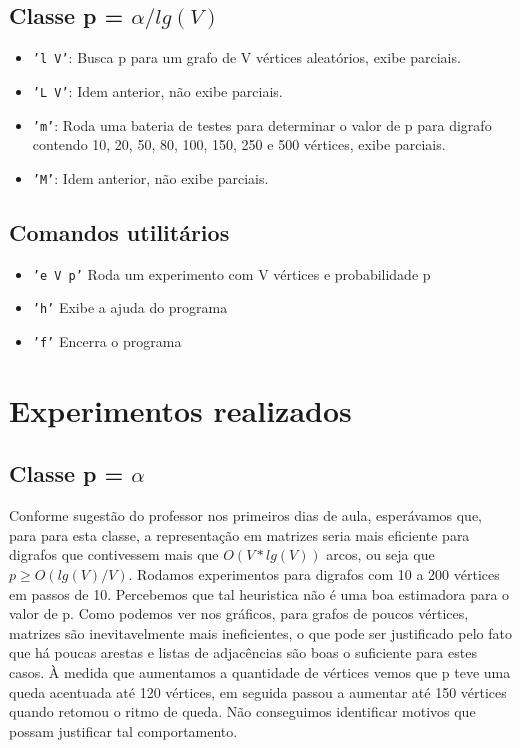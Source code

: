 \documentclass[brazil,times]{abnt}
\begin{document}
\subsection*{Classe p = $\alpha/lg(V)$}
\begin{itemize}
	\item[] \texttt{'l V'}: Busca p para um grafo de V vértices aleatórios, exibe parciais.
	\item[] \texttt{'L V'}: Idem anterior, não exibe parciais.
	\item[] \texttt{'m'}: Roda uma bateria de testes para determinar o valor de p para digrafo contendo 10, 20, 50, 80, 100, 150, 250 e 500 vértices, exibe parciais.
	\item[] \texttt{'M'}: Idem anterior, não exibe parciais.
\end{itemize}

\subsection*{Comandos utilitários}
\begin{itemize}
	\item[] \texttt{'e V p'} Roda um experimento com V vértices e probabilidade p
	\item[] \texttt{'h'} Exibe a ajuda do programa
	\item[] \texttt{'f'} Encerra o programa 
\end{itemize}

\section*{Experimentos realizados}
\subsection*{Classe p = $\alpha$}
Conforme sugestão do professor nos primeiros dias de aula, esperávamos que, para para esta classe, a representação em matrizes seria mais eficiente para digrafos que contivessem mais que $O(V*lg(V))$ arcos, ou seja que $p \ge O(lg(V)/V)$. Rodamos experimentos para digrafos com 10 a 200 vértices em passos de 10. Percebemos que tal heuristica não é uma boa estimadora para o valor de p. Como podemos ver nos gráficos, para grafos de poucos vértices, matrizes são inevitavelmente mais ineficientes, o que pode ser justificado pelo fato que há poucas arestas e listas de adjacências são boas o suficiente para estes casos. À medida que aumentamos a quantidade de vértices vemos que p teve uma queda acentuada até 120 vértices, em seguida passou a aumentar até 150 vértices quando retomou o ritmo de queda. Não conseguimos identificar motivos que possam justificar tal comportamento.
\end{document}
